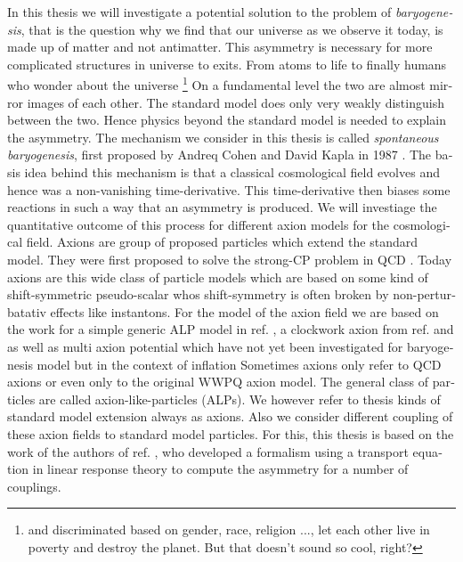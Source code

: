 \documentclass[master,       %
               twoside,        %
               BCOR10mm,       %
               english,ngerman, %
               ]{GAUBM}
\newcommand{\todo}[1]{{\color{magenta}{#1}}}
\begin{document}
\begin{otherlanguage}{english}
In this thesis we will investigate a potential solution to the problem of \emph{baryogenesis}, that is
the question why we find that our universe as we observe it today, is made up of matter and not antimatter.
This asymmetry is necessary for more complicated structures in universe to exits. From atoms to life to finally humans who wonder about the universe \footnote{and discriminated based on gender, race, religion ..., let each other live in poverty and destroy the planet. But that doesn't sound so cool, right?}
On a fundamental level the two are almost mirror images of each other. The standard model does only very weakly distinguish between the two.
Hence physics beyond the standard model is needed to explain the asymmetry.
The mechanism we consider in this thesis is called \emph{spontaneous baryogenesis}, first proposed by Andreq Cohen and David Kapla in 1987 \cite{COHEN1987251} \cite{COHEN1988913}.
The basis idea behind this mechanism is that a classical cosmological field evolves and hence was a non-vanishing time-derivative.
This time-derivative then biases some reactions in such a way that an asymmetry is produced.
We will investiage the quantitative outcome of this process for different axion models for the cosmological field.
Axions are group of proposed particles which extend the standard model.
They were first proposed to solve the strong-CP problem in QCD \cite{PQ1} \cite{PQ2} \cite{Weinberg:1977ma} \cite{Wilczek:1977pj}. Today axions are this wide class of particle models which are based on some kind of shift-symmetric pseudo-scalar whos shift-symmetry is often broken by non-perturbatativ effects like instantons.
For the model of the axion field we are based on the work for a simple generic ALP model in ref. \cite{Kusenko_2015_Axion_Leptogenesis}, a clockwork axion from ref. \cite{Deformed_potential_Bae_2019} and \cite{general_cont_clockwork_Choi_2018} as well as multi axion potential which have not yet been investigated for baryogenesis model but in the context of inflation \todo{????? TODO: reference?????}
Sometimes axions only refer to QCD axions or even only to the original WWPQ axion model. The general class of particles are called axion-like-particles (ALPs). We however refer to thesis kinds of standard model extension always as axions.
Also we consider different coupling of these axion fields to standard model particles. For this, this thesis is based on the work of the authors of ref. \cite{Domcke:2020kcp_Generic_Couplings}, who developed a formalism using a transport equation in linear response theory to compute the asymmetry for a number of couplings.

\end{otherlanguage}
\end{document}
